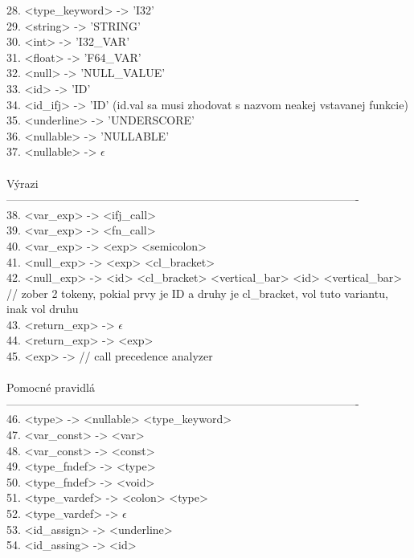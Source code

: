 \documentclass[Slovak, a4paper, 12pt]{article}
\begin{document}
	28. <type\_keyword> -> 'I32'\\
	29. <string> -> 'STRING'\\
	30. <int> -> 'I32\_VAR'\\
	31. <float> -> 'F64\_VAR'\\
	32. <null> -> 'NULL\_VALUE'\\
	33. <id> -> 'ID'\\
	34. <id\_ifj> -> 'ID' (id.val sa musi zhodovat s nazvom neakej vstavanej funkcie)\\
	35. <underline> -> 'UNDERSCORE'\\
	36. <nullable> -> 'NULLABLE'\\
	37. <nullable> -> $\epsilon$\\
	\\
	Výrazi\\
	----------------------------------------------------------------------------------------------\\
	38. <var\_exp> -> <ifj\_call>\\
	39. <var\_exp> -> <fn\_call>\\
	40. <var\_exp> -> <exp> <semicolon>\\
	41. <null\_exp> -> <exp> <cl\_bracket>\\
	42. <null\_exp> -> <id> <cl\_bracket> <vertical\_bar> <id> <vertical\_bar> // zober 2 tokeny, pokial prvy je ID a druhy je cl\_bracket, vol tuto variantu, inak vol druhu\\
	43. <return\_exp> -> $\epsilon$\\
	44. <return\_exp> -> <exp>\\
	45. <exp> -> // call precedence analyzer\\
	\\
    Pomocné pravidlá\\
	----------------------------------------------------------------------------------------------\\
	46. <type> -> <nullable> <type\_keyword>\\
	47. <var\_const> -> <var>\\
	48. <var\_const> -> <const>\\
	49. <type\_fndef> -> <type>\\
	50. <type\_fndef> -> <void>\\
	51. <type\_vardef> -> <colon> <type>\\
	52. <type\_vardef> -> $\epsilon$\\
	53. <id\_assign> -> <underline>\\
	54. <id\_assing> -> <id>\\
\end{document}
